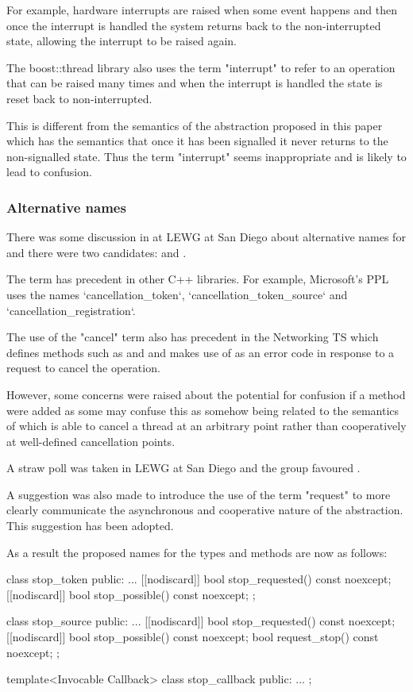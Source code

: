 For example, hardware interrupts are raised when some event happens and then
once the interrupt is handled the system returns back to the non-interrupted
state, allowing the interrupt to be raised again.

The boost::thread library also uses the term "interrupt" to refer to an operation
that can be raised many times and when the interrupt is handled the state is
reset back to non-interrupted.

This is different from the semantics of the abstraction proposed in this paper 
which has the semantics that once it has been signalled it never returns to
the non-signalled state. Thus the term "interrupt" seems inappropriate and is
likely to lead to confusion.

\subsubsection*{Alternative names}

There was some discussion in at LEWG at San Diego about alternative names
for  and there were two candidates:
 and .

The term  has precedent in other C++ libraries.
For example, Microsoft's PPL uses the names `cancellation_token`, `cancellation_token_source`
and `cancellation_registration`.

The use of the "cancel" term also has precedent in the Networking TS which defines methods
such as  and  and makes
use of  as an error code in response to a request to
cancel the operation.

However, some concerns were raised about the potential for confusion if a 
method were added as some may confuse this as somehow being related to the semantics of
 which is able to cancel a thread at an arbitrary point rather than
cooperatively at well-defined cancellation points.

A straw poll was taken in LEWG at San Diego and the group favoured .

A suggestion was also made to introduce the use of the term "request" to more clearly
communicate the asynchronous and cooperative nature of the abstraction. This suggestion
has been adopted.

As a result the proposed names for the types and methods are now as follows:
\begin{codeblock}
class stop_token {
public:
  ...
  [[nodiscard]] bool stop_requested() const noexcept;
  [[nodiscard]] bool stop_possible() const noexcept;
};

class stop_source {
public:
  ...
  [[nodiscard]] bool stop_requested() const noexcept;
  [[nodiscard]] bool stop_possible() const noexcept;
  bool request_stop() const noexcept;
};

template<Invocable Callback>
class stop_callback {
public:
  ...
};
\end{codeblock}

